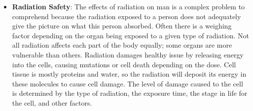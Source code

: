 \documentclass[12pt]{article}
\begin{document}
\begin{itemize}
\item \textbf{Radiation Safety}: \newline
The effects of radiation on man is a complex problem to comprehend because the radiation exposed to a person does not adequately give the picture on what this person absorbed.  Often there is a weighing factor depending on the organ being exposed to a given type of radiation.  Not all radiation affects each part of the body equally; some organs are more vulnerable than others.  Radiation damages healthy issue by releasing energy into the cells, causing mutations or cell death depending on the dose.  Cell tissue is mostly proteins and water, so the radiation will deposit its energy in these molecules to cause cell damage.  The level of damage caused to the cell is determined by the type of radiation, the exposure time, the stage in life for the cell, and other factors. 

\end{itemize}
\end{document}
